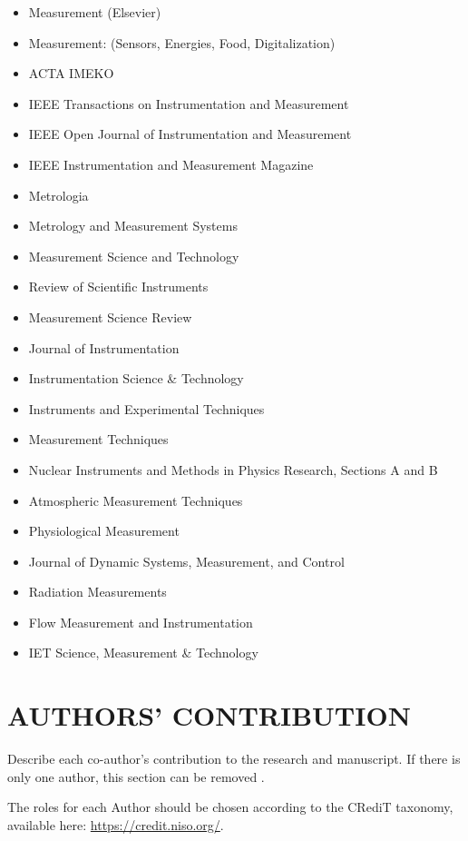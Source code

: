 \documentclass{imeko_wc}
\begin{document}
\begin{itemize}
	\item Measurement (Elsevier)
	\item Measurement: (Sensors, Energies, Food, Digitalization)
	\item ACTA IMEKO
	\item IEEE Transactions on Instrumentation and Measurement
	\item IEEE Open Journal of Instrumentation and Measurement
	\item IEEE Instrumentation and Measurement Magazine
	\item Metrologia
	\item Metrology and Measurement Systems
	\item Measurement Science and Technology
	\item Review of Scientific Instruments
	\item Measurement Science Review
	\item Journal of Instrumentation
	\item Instrumentation Science \& Technology
	\item Instruments and Experimental Techniques
	\item Measurement Techniques
	\item Nuclear Instruments and Methods in Physics Research, Sections A and B
	\item Atmospheric Measurement Techniques
	\item Physiological Measurement
	\item Journal of Dynamic Systems, Measurement, and Control
	\item Radiation Measurements
	\item Flow Measurement and Instrumentation
	\item IET Science, Measurement \& Technology
\end{itemize}



\section*{AUTHORS' CONTRIBUTION}

Describe each co-author's contribution to the research and manuscript. If there is only one author, this section can be removed \cite{Alsereidi2022,Mugnaini2022}.

The roles for each Author should be chosen according to the
CRediT taxonomy, available here: \url{https://credit.niso.org/}.
\end{document}
